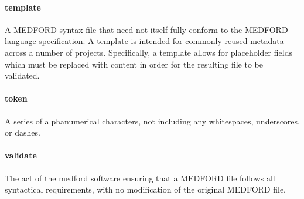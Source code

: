 \documentclass[10pt]{article}
\begin{document}
{{	    \paragraph{template} A MEDFORD-syntax file that need not itself fully conform to the MEDFORD language specification. A template is intended for commonly-reused metadata across a number of projects. Specifically, a template allows for placeholder fields which must be replaced with content in order for the resulting file to be validated.
	    
	    \paragraph{token} A series of alphanumerical characters, not including any whitespaces, underscores, or dashes.
	    
	    \paragraph{validate} The act of the medford software ensuring that a MEDFORD file follows all syntactical requirements, with no modification of the original MEDFORD file.
    }
}
\pagebreak
\end{document}
